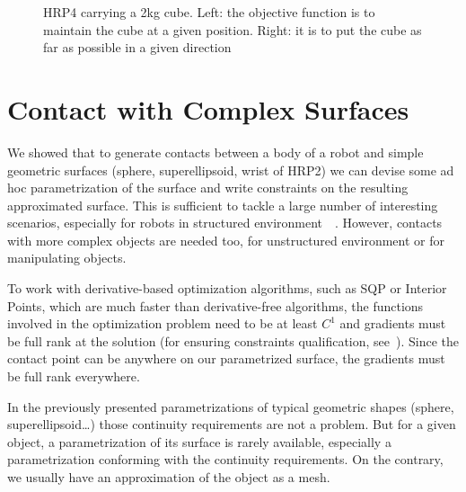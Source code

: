 \begin{figure}
\centering
  \centering
  \setlength\fboxsep{0pt}
  \setlength\fboxrule{1pt}
\caption{HRP4 carrying a 2kg cube.
Left: the objective function is to maintain the cube at a given position.
Right: it is to put the cube as far as possible in a given direction}
\label{fig:hrp4_cube}
\end{figure}

\section{Contact with Complex Surfaces}
\label{sec:contact_with_complex_surfaces}

We showed that to generate contacts between a body of a robot and simple geometric surfaces (sphere, superellipsoid, wrist of HRP2) we can devise some ad hoc parametrization of the surface and write constraints on the resulting approximated surface.
This is sufficient to tackle a large number of interesting scenarios, especially for robots in structured environment~\cite{vaillant:humanoids:2014}~\cite{vaillant:autonomousrobots:2016}.
However, contacts with more complex objects are needed too, for unstructured environment or for manipulating objects.

To work with derivative-based optimization algorithms, such as SQP or Interior Points, which are much faster than derivative-free algorithms, the functions involved in the optimization problem need to be at least $C^1$ and gradients must be full rank at the solution (for ensuring constraints qualification, see~\cite{nocedal:book:2006}).
Since the contact point can be anywhere on our parametrized surface, the gradients must be full rank everywhere.

In the previously presented parametrizations of typical geometric shapes (sphere, superellipsoid\ldots) those continuity requirements are not a problem.
But for a given object, a parametrization of its surface is rarely available, especially a parametrization conforming with the continuity requirements.
On the contrary, we usually have an approximation of the object as a mesh.

